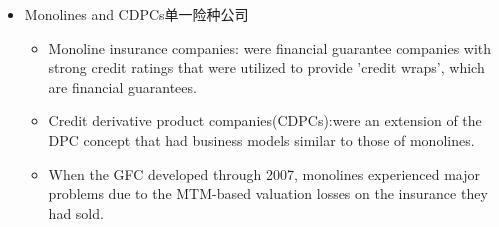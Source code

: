 \begin{itemize}
\begin{itemize}
\item However, was such a triple-A entity of a double-A or worse bank really a better counterparty than the bank itself?
\begin{itemize}
    \item The GFC essentially killed the already-declining world of DPCs.
    \item A DPC's fate inextricably with that of its parent. DPCs的命运与其母公司的命运密不可分地联系在一起
\end{itemize}

\end{itemize}

\item Monolines and CDPCs单一险种公司
\begin{itemize}
    \item Monoline insurance companies: were financial guarantee companies with strong credit ratings that were utilized to provide 'credit wraps', which are financial guarantees.
    \item Credit derivative product companies(CDPCs):were an extension of the DPC concept that had business models similar to those of monolines.
    \item When the GFC developed through 2007, monolines experienced major problems due to the MTM-based valuation losses on the insurance they had sold.
\end{itemize}


\end{itemize}
